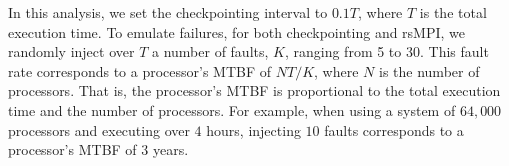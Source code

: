 

In this analysis, we set the checkpointing interval to $0.1T$, where $T$ is the total execution time. To emulate failures, for both checkpointing and rsMPI, we randomly inject over $T$ a number of faults, $K$, ranging from 5 to 30. This fault rate corresponds to a processor's MTBF of $NT/K$, where $N$ is the number of processors. That is, the processor's MTBF is proportional to the total execution time and the number of processors. For example, %
when using a system of $64,000$ processors and executing over $4$ hours, injecting $10$ faults corresponds to a processor's MTBF of $3$ years.

